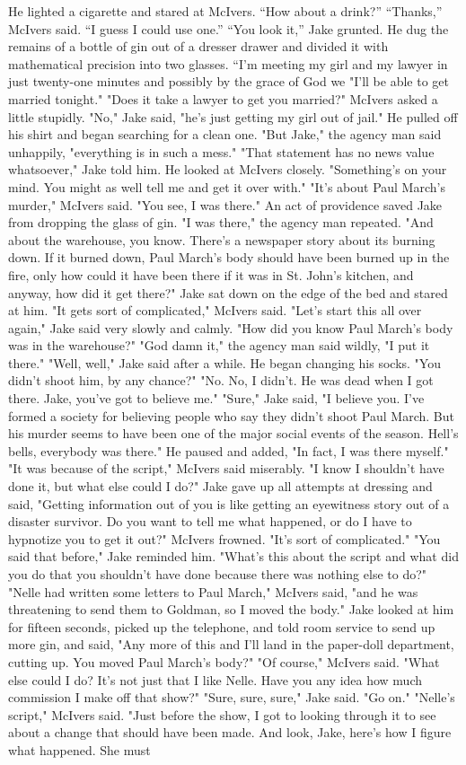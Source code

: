 \documentclass{novel}
\begin{document}
He lighted a cigarette and stared at McIvers. “How about a drink?” “Thanks,” McIvers said. “I guess I could use one.” “You look it,” Jake grunted. He dug the remains of a bottle of gin out of a dresser drawer and divided it with mathematical precision into two glasses. “I’m meeting my girl and my lawyer in just twenty-one minutes and possibly by the grace of God we "I'll be able to get married tonight." "Does it take a lawyer to get you married?" McIvers asked a little stupidly. "No," Jake said, "he's just getting my girl out of jail." He pulled off his shirt and began searching for a clean one. "But Jake," the agency man said unhappily, "everything is in such a mess." "That statement has no news value whatsoever," Jake told him. He looked at McIvers closely. "Something's on your mind. You might as well tell me and get it over with." "It's about Paul March's murder," McIvers said. "You see, I was there." An act of providence saved Jake from dropping the glass of gin. "I was there," the agency man repeated. "And about the warehouse, you know. There's a newspaper story about its burning down. If it burned down, Paul March's body should have been burned up in the fire, only how could it have been there if it was in St. John's kitchen, and anyway, how did it get there?" Jake sat down on the edge of the bed and stared at him. "It gets sort of complicated," McIvers said. "Let's start this all over again," Jake said very slowly and calmly. "How did you know Paul March's body was in the warehouse?" "God damn it," the agency man said wildly, "I put it there." "Well, well," Jake said after a while. He began changing his socks. "You didn't shoot him, by any chance?" "No. No, I didn't. He was dead when I got there. Jake, you've got to believe me." "Sure," Jake said, "I believe you. I've formed a society for believing people who say they didn't shoot Paul March. But his murder seems to have been one of the major social events of the season. Hell's bells, everybody was there." He paused and added, "In fact, I was there myself." "It was because of the script," McIvers said miserably. "I know I shouldn't have done it, but what else could I do?" Jake gave up all attempts at dressing and said, "Getting information out of you is like getting an eyewitness story out of a disaster survivor. Do you want to tell me what happened, or do I have to hypnotize you to get it out?" McIvers frowned. "It's sort of complicated." "You said that before," Jake reminded him. "What's this about the script and what did you do that you shouldn't have done because there was nothing else to do?" "Nelle had written some letters to Paul March," McIvers said, "and he was threatening to send them to Goldman, so I moved the body." Jake looked at him for fifteen seconds, picked up the telephone, and told room service to send up more gin, and said, "Any more of this and I'll land in the paper-doll department, cutting up. You moved Paul March's body?" "Of course," McIvers said. "What else could I do? It's not just that I like Nelle. Have you any idea how much commission I make off that show?" "Sure, sure, sure," Jake said. "Go on." "Nelle's script," McIvers said. "Just before the show, I got to looking through it to see about a change that should have been made. And look, Jake, here's how I figure what happened. She must 
\end{document}
